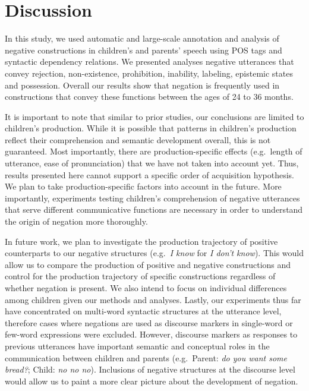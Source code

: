 \documentclass[
  english,
  man,floatsintext]{apa6}
\begin{document}
\hypertarget{discussion}{%
\section{Discussion}\label{discussion}}

In this study, we used automatic and large-scale annotation and analysis of negative constructions in children's and parents' speech using POS tags and syntactic dependency relations. We presented analyses negative utterances that convey rejection, non-existence, prohibition, inability, labeling, epistemic states and possession. Overall our results show that negation is frequently used in constructions that convey these functions between the ages of 24 to 36 months.

It is important to note that similar to prior studies, our conclusions are limited to children's production. While it is possible that patterns in children's production reflect their comprehension and semantic development overall, this is not guaranteed. Most importantly, there are production-specific effects (e.g.~length of utterance, ease of pronunciation) that we have not taken into account yet. Thus, results presented here cannot support a specific order of acquisition hypothesis. We plan to take production-specific factors into account in the future. More importantly, experiments testing children's comprehension of negative utterances that serve different communicative functions are necessary in order to understand the origin of negation more thoroughly.

In future work, we plan to investigate the production trajectory of positive counterparts to our negative structures (e.g.~\emph{I know} for \emph{I don't know}). This would allow us to compare the production of positive and negative constructions and control for the production trajectory of specific constructions regardless of whether negation is present. We also intend to focus on individual differences among children given our methods and analyses. Lastly, our experiments thus far have concentrated on multi-word syntactic structures at the utterance level, therefore cases where negations are used as discourse markers in single-word or few-word expressions were excluded. However, discourse markers as responses to previous utterances have important semantic and conceptual roles in the communication between children and parents (e.g.~Parent: \emph{do you want some bread?}; Child: \emph{no no no}). Inclusions of negative structures at the discourse level would allow us to paint a more clear picture about the development of negation.
\end{document}
